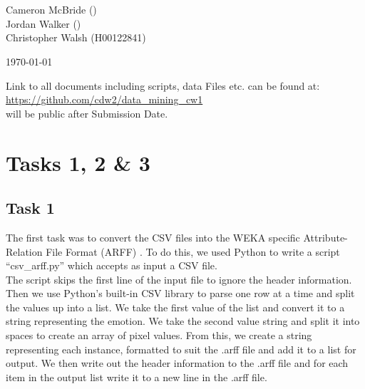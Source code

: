 \documentclass[12pt]{article}
\def \projectTitle {F20DL Data Mining \& Machine Learning}
\def \projectSubtitle {Coursework 1}
\def \authorOne {Cameron McBride}
\def \authorOneID {}
\def \authorTwo{Jordan Walker}
\def \authorTwoID {}
\def \authorThree{Christopher Walsh}
\def \authorThreeID {H00122841}
\begin{document}
\begin{titlepage}
\begin{center}
		\vspace*{3cm}
		{\Huge \color{blue}{\projectTitle}}\\[4mm]
		{\huge \color{grey}{\projectSubtitle}}\\[2cm]
		
		{\Large {\authorOne} ({\authorOneID})}\\[4mm]
		{\Large {\authorTwo} ({\authorTwoID})}\\[4mm]
		{\Large {\authorThree} ({\authorThreeID})}\\[4mm]
		
		\vspace{6cm}
		
		{\large \color{grey}{Date:}}
		{\large \today}
		
		\vspace{2cm}
		
		Link to all documents including scripts, data Files etc. can be found at: 
		\href{https://github.com/cdw2/data_mining_cw1}{https://github.com/cdw2/data\_mining\_cw1}\\
		
		{\color{grey} \footnotesize *will be public after Submission Date. }
		
		\vspace{3cm}
\end{center}
\end{titlepage}

\section{Tasks 1, 2 \& 3}

\subsection{Task 1}


The first task was to convert the CSV files into the WEKA specific Attribute-Relation File Format (ARFF) \cite{wakito2008}. To do this, we used Python to write a script ``csv\_arff.py'' which accepts as input a CSV file.\\

The script skips the first line of the input file to ignore the header information. Then we use Python's built-in CSV library to parse one row at a time and split the values up into a list. We take the first value of the list and convert it to a string representing the emotion. We take the second value string and split it into spaces to create an array of pixel values. From this, we create a string representing each instance, formatted to suit the .arff file and add it to a list for output. We then write out the header information to the .arff file and for each item in the output list write it to a new line in the .arff file.
\end{document}
